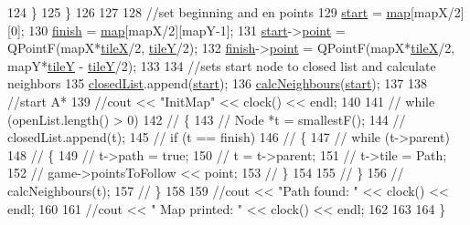 \begin{DoxyCode}
124         \}
125     \}
126 
127 
128     \textcolor{comment}{//set beginning and en points}
129     \hyperlink{class_map_aafcbf6f458eb48f4945f3d0b58d2ef85}{start} = \hyperlink{class_map_a7298e7a7b5dbdc642c49ded9a2c754a5}{map}[mapX/2][0];
130     \hyperlink{class_map_abdb357cb53c27be3b6e3c2b54bfde669}{finish} = \hyperlink{class_map_a7298e7a7b5dbdc642c49ded9a2c754a5}{map}[mapX/2][mapY-1];
131     \hyperlink{class_map_aafcbf6f458eb48f4945f3d0b58d2ef85}{start}->\hyperlink{class_node_a77faa088c74e20a361a181b58e8a4c7f}{point} = QPointF(mapX*\hyperlink{class_map_af2aa425dd22aba483ae973c4a15fe934}{tileX}/2, \hyperlink{class_map_a483dfba507cee9d2fa60a074992b1fcf}{tileY}/2);
132     \hyperlink{class_map_abdb357cb53c27be3b6e3c2b54bfde669}{finish}->\hyperlink{class_node_a77faa088c74e20a361a181b58e8a4c7f}{point} = QPointF(mapX*\hyperlink{class_map_af2aa425dd22aba483ae973c4a15fe934}{tileX}/2, mapY*\hyperlink{class_map_a483dfba507cee9d2fa60a074992b1fcf}{tileY} - 
      \hyperlink{class_map_a483dfba507cee9d2fa60a074992b1fcf}{tileY}/2);
133 
134     \textcolor{comment}{//sets start node to closed list and calculate neighbors}
135     \hyperlink{class_map_ae1ced58b787598940bb444659bacd7d3}{closedList}.append(\hyperlink{class_map_aafcbf6f458eb48f4945f3d0b58d2ef85}{start});
136     \hyperlink{class_map_adac9fc32a2c840b40e1417292e846fe2}{calcNeighbours}(\hyperlink{class_map_aafcbf6f458eb48f4945f3d0b58d2ef85}{start});
137 
138     \textcolor{comment}{//start A*}
139     \textcolor{comment}{//cout << "InitMap" << clock() << endl;}
140 
141 \textcolor{comment}{//    while (openList.length() > 0)}
142 \textcolor{comment}{//    \{}
143 \textcolor{comment}{//        Node *t = smallestF();}
144 \textcolor{comment}{//        closedList.append(t);}
145 \textcolor{comment}{//        if (t == finish)}
146 \textcolor{comment}{//        \{}
147 \textcolor{comment}{//            while (t->parent)}
148 \textcolor{comment}{//            \{}
149 \textcolor{comment}{//                t->path = true;}
150 \textcolor{comment}{//                t = t->parent;}
151 \textcolor{comment}{//                t->tile = Path;}
152 \textcolor{comment}{//                game->pointsToFollow << point;}
153 \textcolor{comment}{//            \}}
154 
155 \textcolor{comment}{//        \}}
156 \textcolor{comment}{//        calcNeighbours(t);}
157 \textcolor{comment}{//    \}}
158 
159     \textcolor{comment}{//cout << "Path found: " << clock() << endl;}
160 
161     \textcolor{comment}{//cout << " Map printed: " << clock() << endl;}
162 
163 
164 \}
\end{DoxyCode}


